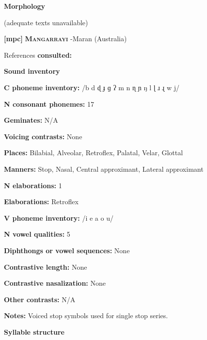 \textbf{Morphology}



(adequate texts unavailable)



\textbf{[mpc]}   \textbf{\textsc{Mangarrayi}  }  -Maran (Australia)



References \textbf{consulted:} \citet{Merlan1989}



\textbf{Sound inventory}



\textbf{C phoneme inventory:} /b d ɖ ɟ ɡ ʔ m n ɳ ɲ ŋ l ɭ ɹ ɻ w j/



\textbf{N consonant phonemes:} 17



\textbf{Geminates:} N/A



\textbf{Voicing contrasts:} None



\textbf{Places:} Bilabial, Alveolar, Retroflex, Palatal, Velar, Glottal



\textbf{Manners:} Stop, Nasal, Central approximant, Lateral approximant



\textbf{N elaborations:} 1



\textbf{Elaborations:} Retroflex



\textbf{V phoneme inventory:} /i e a o u/



\textbf{N vowel qualities:} 5



\textbf{Diphthongs or vowel sequences:} None



\textbf{Contrastive length:} None



\textbf{Contrastive nasalization:} None



\textbf{Other contrasts:} N/A



\textbf{Notes:} Voiced stop symbols used for single stop series.



\textbf{Syllable structure}



